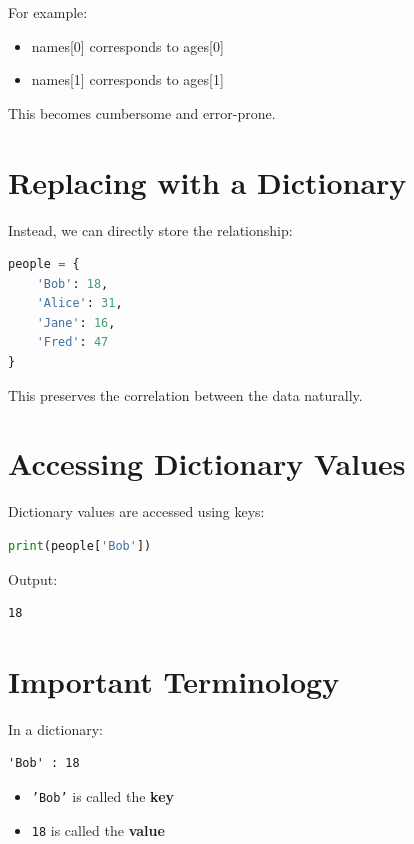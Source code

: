\documentclass[11pt]{article}
\begin{document}
For example:

\begin{itemize}
    \item names[0] corresponds to ages[0]
    \item names[1] corresponds to ages[1]
\end{itemize}

This becomes cumbersome and error-prone.

\section{Replacing with a Dictionary}

Instead, we can directly store the relationship:

\begin{lstlisting}[language=Python]
people = {
    'Bob': 18,
    'Alice': 31,
    'Jane': 16,
    'Fred': 47
}
\end{lstlisting}

This preserves the correlation between the data naturally.

\section{Accessing Dictionary Values}

Dictionary values are accessed using keys:

\begin{lstlisting}[language=Python]
print(people['Bob'])
\end{lstlisting}

Output:

\begin{lstlisting}
18
\end{lstlisting}

\section{Important Terminology}

In a dictionary:

\begin{lstlisting}
'Bob' : 18
\end{lstlisting}

\begin{itemize}
    \item \texttt{'Bob'} is called the \textbf{key}
    \item \texttt{18} is called the \textbf{value}
\end{itemize}
\end{document}
